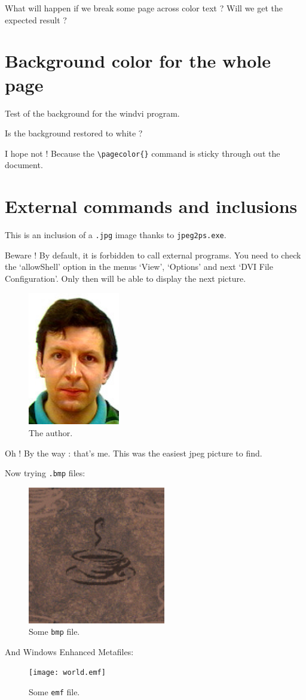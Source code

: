 \documentclass[a4paper, 11pt]{article}
\begin{document}
What will happen if we {\color{blue} break some \newpage page across
  color text ?} Will we get the expected result ?

\newpage
\section{Background color for the whole page}
\pagecolor{yellow}

Test of the background for the {\color{red} windvi program}.

\newpage

Is the background restored to white ?

I hope not ! Because the \verb+\pagecolor{}+ command is sticky through
out the document.

\newpage
\section{External commands and inclusions}
\pagecolor{white}

\noindent
This is an inclusion of a \texttt{.jpg} image thanks to
\texttt{jpeg2ps.exe}.

Beware ! By default, it is forbidden to call external programs. You
need to check the `allowShell' option in the menus `View', `Options'
and next `DVI File Configuration'. Only then \windvi will be able to
display the next picture.

\begin{figure}[ht]
  \centering\includegraphics[width=4cm]{fab.jpg}
  \caption{The author.}
\end{figure}

\noindent Oh ! By the way : that's me. This was the easiest jpeg picture to
find.

\noindent
Now trying \texttt{.bmp} files:
\begin{figure}[ht]
  \centering\includegraphics[width=6cm,height=6cm]{coffee_bean.bmp}
  \caption{Some \texttt{bmp} file.}
\end{figure}

\newpage
\noindent
And Windows Enhanced Metafiles:
\begin{figure}[ht]
  \centering\texttt{[image: world.emf]}
  \caption{Some \texttt{emf} file.}
\end{figure}
\end{document}
